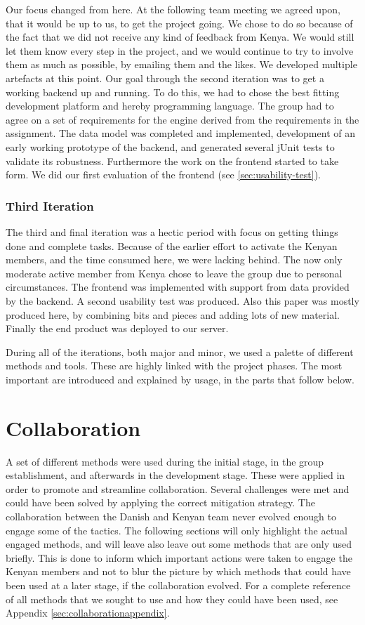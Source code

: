 Our focus changed from here. At the following team meeting we agreed upon, that it would be up to us, to get the project going. We chose to do so because of the fact that we did not receive any kind of feedback from Kenya. We would still let them know every step in the project, and we would continue to try to involve them as much as possible, by emailing them and the likes. We developed multiple artefacts at this point. Our goal through the second iteration was to get a working backend up and running. To do this, we had to chose the best fitting development platform and hereby programming language. The group had to agree on a set of requirements for the engine derived from the requirements in the assignment. The data model was completed and implemented, development of an early working prototype of the backend, and generated several jUnit tests to validate its robustness. Furthermore the work on the frontend started to take form. We did our first evaluation of the frontend (see \ref{sec:usability-test}).

\subsubsection{Third Iteration}
The third and final iteration was a hectic period with focus on getting things done and complete tasks. Because of the earlier effort to activate the Kenyan members, and the time consumed here, we were lacking behind. The now only moderate active member from Kenya chose to leave the group due to personal circumstances. The frontend was implemented with support from data provided by the backend. A second usability test was produced. Also this paper was mostly produced here, by combining bits and pieces and adding lots of new material. Finally the end product was deployed to our server.

During all of the iterations, both major and minor, we used a palette of different methods and tools. These are highly linked with the project phases. The most important are introduced and explained by usage, in the parts that follow below.

\section{Collaboration} \label{sec:collaboration}
A set of different methods were used during the initial stage, in the group establishment, and afterwards in the development stage. These were applied in order to promote and streamline collaboration. Several challenges were met and could have been solved by applying the correct mitigation strategy. The collaboration between the Danish and Kenyan team never evolved enough to engage some of the tactics. The following sections will only highlight the actual engaged methods, and will leave also leave out some methods that are only used briefly. This is done to inform which important actions were taken to engage the Kenyan members and not to blur the picture by which methods that could have been used at a later stage, if the collaboration evolved. For a complete reference of all methods that we sought to use and how they could have been used, see Appendix \ref{sec:collaborationappendix}.

